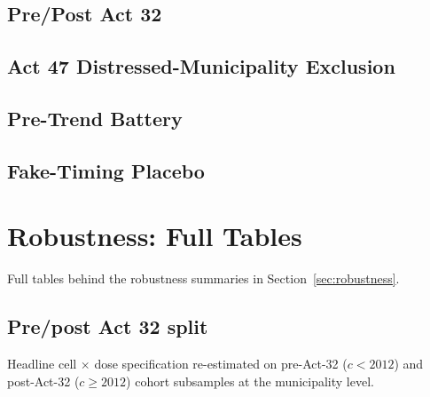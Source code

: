 \documentclass[12pt]{article}
\begin{document}
\subsection{Pre/Post Act 32}
\label{app:pooled-act32}



\subsection{Act 47 Distressed-Municipality Exclusion}
\label{app:pooled-act47}



\subsection{Pre-Trend Battery}
\label{app:pooled-pretrend}



\subsection{Fake-Timing Placebo}
\label{app:pooled-faketiming}



\section{Robustness: Full Tables}
\label{app:robustness}

Full tables behind the robustness summaries in
Section~\ref{sec:robustness}.

\subsection{Pre/post Act 32 split}
\label{app:rob-act32}

Headline cell $\times$ dose specification re-estimated on pre-Act-32
($c<2012$) and post-Act-32 ($c\geq 2012$) cohort subsamples at the
municipality level.


\end{document}
